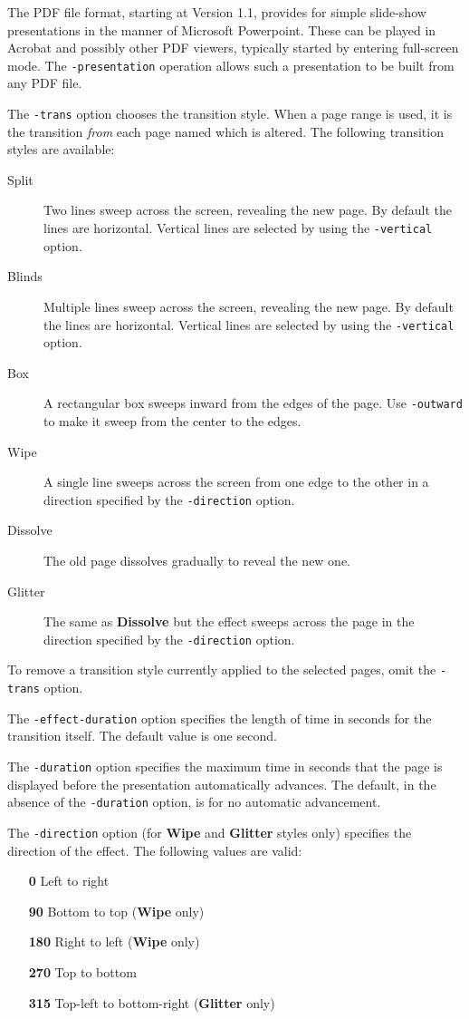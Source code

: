 \documentclass{book}
\begin{document}
  \vspace{12mm}
The PDF file format, starting at Version 1.1, provides for simple slide-show
presentations in the manner of Microsoft Powerpoint. These can be played in
Acrobat and possibly other PDF viewers, typically started by entering
full-screen mode. The \texttt{-presentation} operation allows such a
presentation to be built from any PDF file.

The \texttt{-trans} option chooses the transition style. When a page range is
used, it is the transition \textit{from} each page named which is altered. The
following transition styles are available:

\begin{description}
  \item[Split]Two lines sweep across the screen, revealing the new page. By
default the lines are horizontal. Vertical lines are selected by using the
\texttt{-vertical} option.
  \item[Blinds]Multiple lines sweep across the screen, revealing the new page.
By default the lines are horizontal. Vertical lines are selected by using the
\texttt{-vertical} option.
  \item[Box]A rectangular box sweeps inward from the edges of the page. Use
\texttt{-outward} to make it sweep from the center to the edges.
  \item[Wipe]A single line sweeps across the screen from one edge to the other
in a direction specified by the \texttt{-direction} option.
  \item[Dissolve]The old page dissolves gradually to reveal the new one.
  \item[Glitter]The same as \textbf{Dissolve} but the effect sweeps across the
page in the direction specified by the \texttt{-direction} option.
\end{description}

\noindent To remove a transition style currently applied to the selected pages,
omit the \texttt{-trans} option.

The \texttt{-effect-duration} option specifies the length of time in seconds
for the transition itself. The default value is one second.

The \texttt{-duration} option specifies the maximum time in seconds that the
page is displayed before the presentation automatically advances. The default,
in the absence of the \texttt{-duration} option, is for no automatic
advancement.

The \texttt{-direction} option (for \textbf{Wipe} and \textbf{Glitter} styles
only) specifies the direction of the effect. The following values are valid:
\begin{itemize}
  \item[\textbf{0}] Left to right
  \item[\textbf{90}] Bottom to top (\textbf{Wipe} only)
  \item[\textbf{180}] Right to left (\textbf{Wipe} only)
  \item[\textbf{270}] Top to bottom
  \item[\textbf{315}] Top-left to bottom-right (\textbf{Glitter} only)
\end{itemize}
\end{document}
